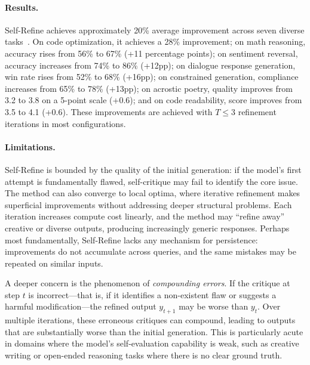 \paragraph{Results.}
Self-Refine achieves approximately 20\% average improvement across seven diverse tasks~\citep{madaan2023selfrefine}. On code optimization, it achieves a 28\% improvement; on math reasoning, accuracy rises from 56\% to 67\% (+11 percentage points); on sentiment reversal, accuracy increases from 74\% to 86\% (+12pp); on dialogue response generation, win rate rises from 52\% to 68\% (+16pp); on constrained generation, compliance increases from 65\% to 78\% (+13pp); on acrostic poetry, quality improves from 3.2 to 3.8 on a 5-point scale (+0.6); and on code readability, score improves from 3.5 to 4.1 (+0.6). These improvements are achieved with $T \leq 3$ refinement iterations in most configurations.

\paragraph{Limitations.}
Self-Refine is bounded by the quality of the initial generation: if the model's first attempt is fundamentally flawed, self-critique may fail to identify the core issue. The method can also converge to local optima, where iterative refinement makes superficial improvements without addressing deeper structural problems. Each iteration increases compute cost linearly, and the method may ``refine away'' creative or diverse outputs, producing increasingly generic responses. Perhaps most fundamentally, Self-Refine lacks any mechanism for persistence: improvements do not accumulate across queries, and the same mistakes may be repeated on similar inputs.

A deeper concern is the phenomenon of \emph{compounding errors}. If the critique at step $t$ is incorrect---that is, if it identifies a non-existent flaw or suggests a harmful modification---the refined output $y_{t+1}$ may be worse than $y_t$. Over multiple iterations, these erroneous critiques can compound, leading to outputs that are substantially worse than the initial generation. This is particularly acute in domains where the model's self-evaluation capability is weak, such as creative writing or open-ended reasoning tasks where there is no clear ground truth.

